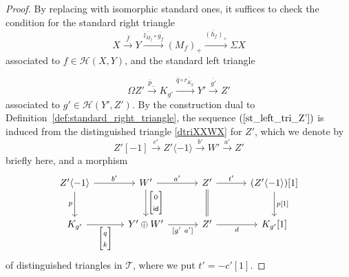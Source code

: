 \documentclass[a4paper,reqno,10pt]{amsart}
\theoremstyle{definition}
\theoremstyle{definition}
\theoremstyle{definition}
\theoremstyle{definition}
\theoremstyle{plain}
\newcommand{\id}{\mathsf{id}}
\newcommand{\CH}{\mathcal{H}}
\newcommand{\CT}{\mathcal{T}}
\begin{document}
\begin{proof}
By replacing with isomorphic standard ones, it suffices to check the condition for the standard right triangle
\[
X\xrightarrow{\overline{f}}Y\xrightarrow{\overline{l_{M_f}}\circ \overline{g_f}}(M_f)_+\xrightarrow{\overline{(h_f)}_+}\Sigma X
\]
associated to $f\in\CH(X,Y)$, and the standard left triangle

\begin{equation}\label{st_left_tri_Z'}
\Omega Z'\xrightarrow{\overline{p}_-}K_{g'}\xrightarrow{\overline{q}\circ \overline{r_{K_{g'}}}}Y'\xrightarrow{\overline{g'}}Z'
\end{equation}
associated to $g'\in\CH(Y',Z')$.
By the construction dual to Definition~\ref{def:standard_right_triangle}, the sequence $(\ref{st_left_tri_Z'})$ is induced from 
the distinguished triangle \eqref{dtriXXWX} for $Z'$, which we denote by
\[
Z'[-1]\xrightarrow{c'}Z'\langle-1\rangle\xrightarrow{b'}W'\xrightarrow{a'}Z'
\]
briefly here, and a morphism
\[
\begin{tikzcd}[row sep=0.9cm, column sep=1.1cm]
Z'\langle-1\rangle
\arrow{r}{b'}
\arrow[d, swap, "p"]
&W'
\arrow{r}{a'}
\arrow{d}{{\begin{bmatrix}0\\ \id\end{bmatrix}}} 
&Z'\arrow{r}{t'} \arrow[d, equal]
&(Z'\langle-1\rangle){[}1{]} 
\arrow[d, "p{[}1{]}"]
\\
K_{g'}
\arrow{r}[swap]{{\begin{bmatrix}q\\ k\end{bmatrix}}}
&Y'\oplus W'
\arrow{r}[swap]{{{[}g'\ a'{]}}}
&Z' \arrow{r}[swap]{d}
&K_{g'}{[}1{]}
\end{tikzcd}
\]
of distinguished triangles in $\CT$, where we put $t'=-c'[1]$.


\end{proof}
\end{document}
